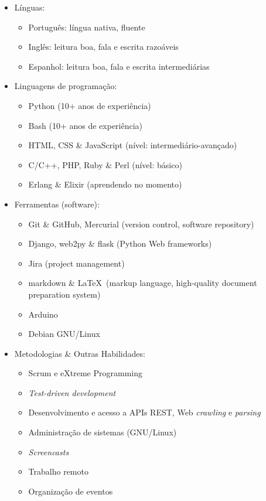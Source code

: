 \documentclass[a4paper,11pt]{article}
\begin{document}
	\begin{itemize}
		\item Línguas:
		\begin{itemize}
			\item Português: língua nativa, fluente
			\item Inglês: leitura boa, fala e escrita razoáveis
			\item Espanhol: leitura boa, fala e escrita intermediárias
		\end{itemize}
		\item Linguagens de programação:
		\begin{itemize}
			\item Python (10+ anos de experiência)
			\item Bash (10+ anos de experiência)
			\item HTML, CSS \& JavaScript (nível: intermediário-avançado)
			\item C/C++, PHP, Ruby \& Perl (nível: básico)
			\item Erlang \& Elixir (aprendendo no momento)
		\end{itemize}
		\item Ferramentas (software):
		\begin{itemize}
			\item Git \& GitHub, Mercurial (version control, software
				repository)
			\item Django, web2py \& flask (Python Web frameworks)
			\item Jira (project management)
			\item markdown \& \LaTeX\ (markup language, high-quality document
				preparation system)
			\item Arduino
			\item Debian GNU/Linux
		\end{itemize}
		\item Metodologias \& Outras Habilidades:
		\begin{itemize}
			\item Scrum e eXtreme Programming
			\item \textit{Test-driven development}
			\item Desenvolvimento e acesso a APIs REST, Web \textit{crawling} e
				\textit{parsing}
			\item Administração de sistemas (GNU/Linux)
			\item \textit{Screencasts}
			\item Trabalho remoto
			\item Organização de eventos
		\end{itemize}
	\end{itemize}
\end{document}
